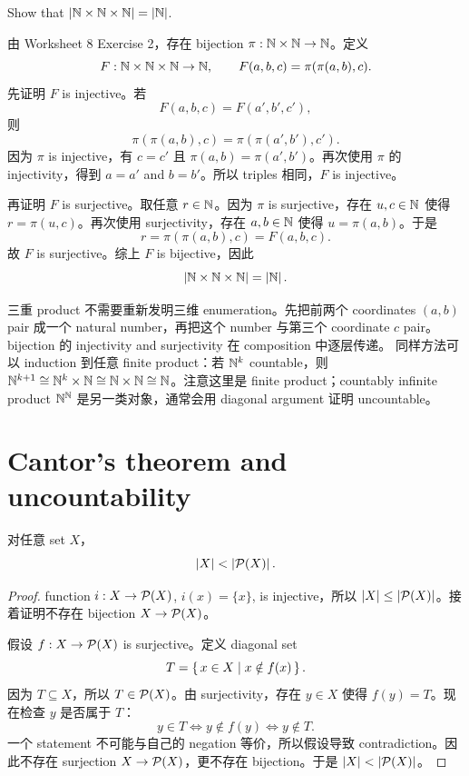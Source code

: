 \begin{exerciseblock}
Show that \(\left|\mathbb{N}\times\mathbb{N}\times\mathbb{N}\right|=\left|\mathbb{N}\right|\).
\end{exerciseblock}

\begin{solution}
由 Worksheet 8 Exercise 2，存在 bijection
\(\pi:\mathbb{N}\times\mathbb{N}\to\mathbb{N}\)。定义
\[
  F:\mathbb{N}\times\mathbb{N}\times\mathbb{N}\to\mathbb{N},\qquad
  F(a,b,c)=\pi(\pi(a,b),c).
\]
先证明 \(F\) is injective。若
\[
  F(a,b,c)=F(a',b',c'),
\]
则
\[
  \pi(\pi(a,b),c)=\pi(\pi(a',b'),c').
\]
因为 \(\pi\) is injective，有 \(c=c'\) 且
\(\pi(a,b)=\pi(a',b')\)。再次使用 \(\pi\) 的 injectivity，得到
\(a=a'\) and \(b=b'\)。所以 triples 相同，\(F\) is injective。

再证明 \(F\) is surjective。取任意 \(r\in\mathbb{N}\)。因为 \(\pi\) is
surjective，存在 \(u,c\in\mathbb{N}\) 使得 \(r=\pi(u,c)\)。再次使用
surjectivity，存在 \(a,b\in\mathbb{N}\) 使得 \(u=\pi(a,b)\)。于是
\[
  r=\pi(\pi(a,b),c)=F(a,b,c).
\]
故 \(F\) is surjective。综上 \(F\) is bijective，因此
\[
  \left|\mathbb{N}\times\mathbb{N}\times\mathbb{N}\right|=\left|\mathbb{N}\right|.
\]
\end{solution}

\begin{explanation}
三重 product 不需要重新发明三维 enumeration。先把前两个 coordinates
\((a,b)\) pair 成一个 natural number，再把这个 number 与第三个
coordinate \(c\) pair。bijection 的 injectivity and surjectivity 在
composition 中逐层传递。
同样方法可以 induction 到任意 finite product：若 \(\mathbb{N}^k\) countable，则
\(\mathbb{N}^{k+1}\cong\mathbb{N}^k\times\mathbb{N}\cong\mathbb{N}\times\mathbb{N}\cong\mathbb{N}\)。注意这里是 finite
product；countably infinite product \(\mathbb{N}^{\mathbb{N}}\) 是另一类对象，通常会用
diagonal argument 证明 uncountable。
\end{explanation}

\section{Cantor's theorem and uncountability}

\begin{theorem}
对任意 set \(X\)，
\[
  \left|X\right|<\left|\mathcal{P}(X)\right|.
\]
\end{theorem}

\begin{proof}
function \(i:X\to\mathcal{P}(X)\), \(i(x)=\{x\}\), is injective，所以
\(\left|X\right|\le\left|\mathcal{P}(X)\right|\)。接着证明不存在 bijection
\(X\to\mathcal{P}(X)\)。

假设 \(f:X\to\mathcal{P}(X)\) is surjective。定义 diagonal set
\[
  T=\left\{\,x\in X\mid x\notin f(x)\,\right\}.
\]
因为 \(T\subseteq X\)，所以 \(T\in\mathcal{P}(X)\)。由 surjectivity，存在
\(y\in X\) 使得 \(f(y)=T\)。现在检查 \(y\) 是否属于 \(T\)：
\[
  y\in T
  \iff y\notin f(y)
  \iff y\notin T.
\]
一个 statement 不可能与自己的 negation 等价，所以假设导致
contradiction。因此不存在 surjection \(X\to\mathcal{P}(X)\)，更不存在
bijection。于是 \(\left|X\right|<\left|\mathcal{P}(X)\right|\)。
\end{proof}

